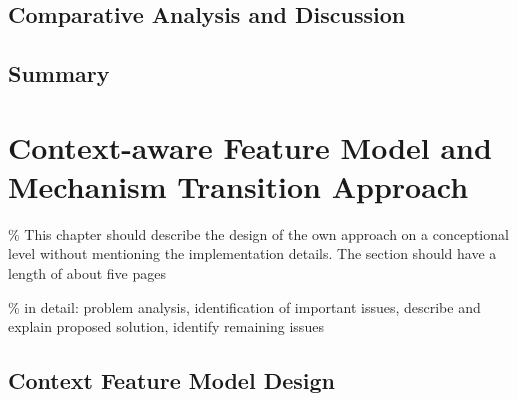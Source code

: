 \section{Comparative Analysis and Discussion} 
\section{Summary}

\chapter{Context-aware Feature Model and Mechanism Transition Approach}

\% This chapter should describe the design of the own approach on a con\gls{cep}tional level without mentioning the implementation details. The section should have a length of about five pages

\% in detail: problem analysis, identification of important issues, describe and explain proposed solution, identify remaining issues



\section{Context Feature Model Design}

